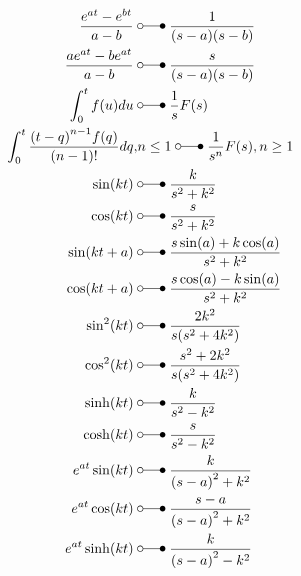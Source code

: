 \begin{align*}
    \frac{e^{at}-e^{bt}}{a-b}       \;                      & \laplace\; \frac{1}{(s-a)(s-b)}                                               \\
    \frac{ae^{at}-be^{at}}{a-b}     \;                      & \laplace\; \frac{s}{(s-a)(s-b)}                                               \\
    \int_{0}^{t}f(u)du              \;                      & \laplace\; \frac{1}{s}F(s)                                                    \\
    \int_{0}^{t}\frac{{(t-q)}^{n-1}f(q)}{(n-1)!}dq,         & n \leq 1 \;\laplace\; \frac{1}{s^n}F(s),n \geq 1                              \\
    \sin(kt)                        \;                      & \laplace\; \frac{k}{s^2+k^2}                                                  \\
    \cos(kt)                        \;                      & \laplace\; \frac{s}{s^2+k^2}                                                  \\
    \sin(kt+a)                      \;                      & \laplace\; \frac{s \sin(a)+k\cos(a)}{s^2+k^2}                                 \\
    \cos(kt+a)                      \;                      & \laplace\; \frac{s \cos(a)-k\sin(a)}{s^2+k^2}                                 \\
    \sin^{2}(kt)                    \;                      & \laplace\; \frac{2k^2}{s(s^2+4k^2)}                                           \\
    \cos^{2}(kt)                    \;                      & \laplace\; \frac{s^2+2k^2}{s(s^2+4k^2)}                                       \\
    \sinh(kt)                       \;                      & \laplace\; \frac{k}{s^2-k^2}                                                  \\
    \cosh(kt)                       \;                      & \laplace\; \frac{s}{s^2-k^2}                                                  \\
    e^{at}\sin(kt)                  \;                      & \laplace\; \frac{k}{{(s-a)}^2+k^2}                                            \\
    e^{at}\cos(kt)                  \;                      & \laplace\; \frac{s-a}{{(s-a)}^2+k^2}                                          \\
    e^{at}\sinh(kt)                 \;                      & \laplace\; \frac{k}{{(s-a)}^2-k^2}                                            \\

\end{align*}
